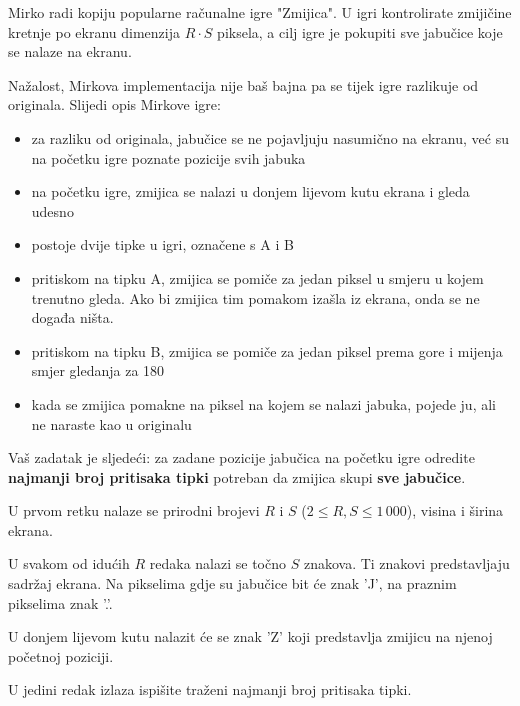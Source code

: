 \renewcommand{\taskname}{ZMIJA}
\renewcommand{\timelimit}{1 sekunda}
\renewcommand{\memorylimit}{32 MB}
\renewcommand{\score}{80 bodova}

Mirko radi kopiju popularne računalne igre "Zmijica". U igri kontrolirate zmijičine kretnje po ekranu dimenzija $R \cdot S$ piksela, a cilj igre je pokupiti sve jabučice koje se nalaze na ekranu. 

Nažalost, Mirkova implementacija nije baš bajna pa se tijek igre razlikuje od originala. Slijedi opis Mirkove igre:
\begin{itemize}
\item za razliku od originala, jabučice se ne pojavljuju nasumično na ekranu, već su na početku igre poznate pozicije svih jabuka
\item na početku igre, zmijica se nalazi u donjem lijevom kutu ekrana i gleda udesno
\item postoje dvije tipke u igri, označene s A i B
\item pritiskom na tipku A, zmijica se pomiče za jedan piksel u smjeru u kojem trenutno gleda. Ako bi zmijica tim pomakom izašla iz ekrana, onda se ne događa ništa.
\item pritiskom na tipku B, zmijica se pomiče za jedan piksel prema gore i mijenja smjer gledanja za 180\textdegree
\item kada se zmijica pomakne na piksel na kojem se nalazi jabuka, pojede ju, ali ne naraste kao u originalu
\end{itemize}

Vaš zadatak je sljedeći: za zadane pozicije jabučica na početku igre odredite \textbf{najmanji broj pritisaka tipki} potreban da zmijica skupi \textbf{sve jabučice}.

\strut


U prvom retku nalaze se prirodni brojevi $R$ i $S$ ($2 \leqslant R, S \leqslant 1\,000$), visina i širina ekrana.

U svakom od idućih $R$ redaka nalazi se točno $S$ znakova. Ti znakovi predstavljaju sadržaj ekrana. Na pikselima gdje su jabučice bit će znak 'J', na praznim pikselima znak '.'.

U donjem lijevom kutu nalazit će se znak 'Z' koji predstavlja zmijicu na njenoj početnoj poziciji.

\strut


U jedini redak izlaza ispišite traženi najmanji broj pritisaka tipki.

